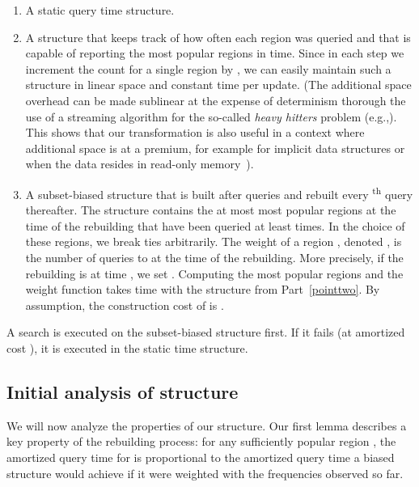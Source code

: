 \documentclass[11pt]{article}
\begin{document}
\begin{enumerate}

\item A static  query time structure. 

\item \label{pointtwo} A structure that keeps track of how often
each region was queried and that is capable of reporting the 
 most popular regions in
 time. Since in each step we increment the count
for a single region by , we can easily maintain such a structure in 
linear space and constant time per update. 
(The additional space overhead can be made sublinear at the expense 
of determinism thorough the use of a streaming algorithm for the 
so-called \emph{heavy hitters} problem (e.g.,\cite{BerindeInCoSt10}). 
This shows that our transformation
is also useful in a context where additional space is at a
premium, for example for implicit data structures or when
the data resides in read-only 
memory~\cite{AsanoMuRoWa11}).

\item A subset-biased structure  that is built after 
 queries and rebuilt every
\textsuperscript{th} query thereafter. The structure 
contains the at most 
 most popular regions at the time of the rebuilding
that have been queried at least  times.
In the choice of these regions, we break ties arbitrarily.
The weight of a region , denoted , is the number of queries to 
 at the time of the
rebuilding. More precisely, if the rebuilding is at time , we set 
.
Computing the  most popular regions and the weight function
 takes time  with the structure from Part~\ref{pointtwo}.  
By assumption, the construction cost of 
is .  
\end{enumerate}

\noindent A search is executed on the subset-biased structure first. If it
fails (at amortized cost ), it is executed in the 
static  time structure. 


\subsection{Initial analysis of structure}

We will now analyze the properties of our structure.
Our first lemma describes a key property of the rebuilding process:
for any sufficiently popular region , the amortized query time for  is 
proportional to the amortized query time a biased structure
would achieve if it were weighted with the frequencies observed so far.
\end{document}
